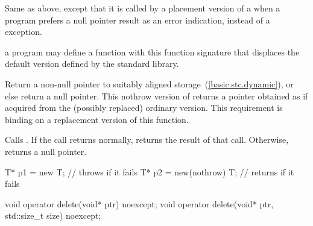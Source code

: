 \begin{itemdescr}
\pnum
\effects
Same as above, except that it is called by a placement version of a
when a \Cpp program prefers a null pointer result as an error indication,
instead of a
exception.

\pnum
\replaceable
a \Cpp program may define a function with this function signature
that displaces the default version defined by the
\Cpp standard library.

\pnum
\required
Return a non-null pointer to suitably aligned storage~(\ref{basic.stc.dynamic}),
or else return a null pointer.
This nothrow version of
returns a pointer obtained as if acquired from the (possibly replaced)
ordinary version.
This requirement is binding on a replacement version of this function.

\pnum
{}
Calls . If the call returns normally,
returns the result of that call. Otherwise, returns a null pointer.

\pnum
\enterexample
\begin{codeblock}
T* p1 = new T;                  // throws  if it fails
T* p2 = new(nothrow) T;         // returns  if it fails
\end{codeblock}
\exitexample
\end{itemdescr}

%
\begin{itemdecl}
void operator delete(void* ptr) noexcept;
void operator delete(void* ptr, std::size_t size) noexcept;
\end{itemdecl}


